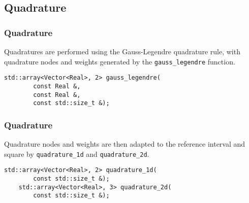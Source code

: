 \subsection{Quadrature}

\begin{frame}[fragile]
    \frametitle{Quadrature}

    Quadratures are performed using the Gauss-Legendre quadrature rule, with quadrature nodes and weights generated by the \lstinline{gauss_legendre} function.

    \begin{lstlisting}[style=cpp]
    std::array<Vector<Real>, 2> gauss_legendre(
        const Real &, 
        const Real &, 
        const std::size_t &);
    \end{lstlisting}
\end{frame}

\begin{frame}[fragile]
    \frametitle{Quadrature}

    Quadrature nodes and weights are then adapted to the reference interval and square by \lstinline{quadrature_1d} and \lstinline{quadrature_2d}.

    \begin{lstlisting}[style=cpp]
    std::array<Vector<Real>, 2> quadrature_1d(
        const std::size_t &);
    std::array<Vector<Real>, 3> quadrature_2d(
        const std::size_t &);
    \end{lstlisting}
\end{frame}